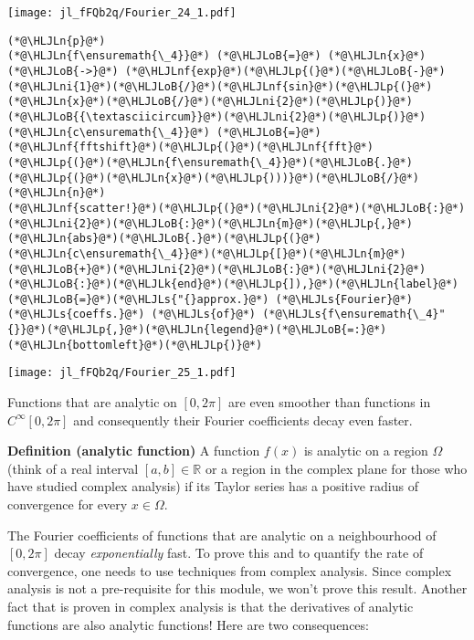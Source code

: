 \documentclass[12pt,a4paper]{article}
\newcommand{\HLJLk}[1]{\textcolor[RGB]{148,91,176}{\textbf{#1}}}
\newcommand{\HLJLn}[1]{#1}
\newcommand{\HLJLnf}[1]{\textcolor[RGB]{66,102,213}{#1}}
\newcommand{\HLJLs}[1]{\textcolor[RGB]{201,61,57}{#1}}
\newcommand{\HLJLni}[1]{\textcolor[RGB]{59,151,46}{#1}}
\newcommand{\HLJLoB}[1]{\textcolor[RGB]{102,102,102}{\textbf{#1}}}
\newcommand{\HLJLp}[1]{#1}
\begin{document}
\texttt{[image: jl\_fFQb2q/Fourier\_24\_1.pdf]}

\begin{lstlisting}
(*@\HLJLn{p}@*)
(*@\HLJLn{f\ensuremath{\_4}}@*) (*@\HLJLoB{=}@*) (*@\HLJLn{x}@*) (*@\HLJLoB{->}@*) (*@\HLJLnf{exp}@*)(*@\HLJLp{(}@*)(*@\HLJLoB{-}@*)(*@\HLJLni{1}@*)(*@\HLJLoB{/}@*)(*@\HLJLnf{sin}@*)(*@\HLJLp{(}@*)(*@\HLJLn{x}@*)(*@\HLJLoB{/}@*)(*@\HLJLni{2}@*)(*@\HLJLp{)}@*)(*@\HLJLoB{{\textasciicircum}}@*)(*@\HLJLni{2}@*)(*@\HLJLp{)}@*)
(*@\HLJLn{c\ensuremath{\_4}}@*) (*@\HLJLoB{=}@*) (*@\HLJLnf{fftshift}@*)(*@\HLJLp{(}@*)(*@\HLJLnf{fft}@*)(*@\HLJLp{(}@*)(*@\HLJLn{f\ensuremath{\_4}}@*)(*@\HLJLoB{.}@*)(*@\HLJLp{(}@*)(*@\HLJLn{x}@*)(*@\HLJLp{)))}@*)(*@\HLJLoB{/}@*)(*@\HLJLn{n}@*)
(*@\HLJLnf{scatter!}@*)(*@\HLJLp{(}@*)(*@\HLJLni{2}@*)(*@\HLJLoB{:}@*)(*@\HLJLni{2}@*)(*@\HLJLoB{:}@*)(*@\HLJLn{m}@*)(*@\HLJLp{,}@*)(*@\HLJLn{abs}@*)(*@\HLJLoB{.}@*)(*@\HLJLp{(}@*)(*@\HLJLn{c\ensuremath{\_4}}@*)(*@\HLJLp{[}@*)(*@\HLJLn{m}@*)(*@\HLJLoB{+}@*)(*@\HLJLni{2}@*)(*@\HLJLoB{:}@*)(*@\HLJLni{2}@*)(*@\HLJLoB{:}@*)(*@\HLJLk{end}@*)(*@\HLJLp{]),}@*)(*@\HLJLn{label}@*)(*@\HLJLoB{=}@*)(*@\HLJLs{"{}approx.}@*) (*@\HLJLs{Fourier}@*) (*@\HLJLs{coeffs.}@*) (*@\HLJLs{of}@*) (*@\HLJLs{f\ensuremath{\_4}"{}}@*)(*@\HLJLp{,}@*)(*@\HLJLn{legend}@*)(*@\HLJLoB{=:}@*)(*@\HLJLn{bottomleft}@*)(*@\HLJLp{)}@*)
\end{lstlisting}

\texttt{[image: jl\_fFQb2q/Fourier\_25\_1.pdf]}

Functions that  are analytic on $[0, 2\pi]$ are even smoother than functions in $C^{\infty}[0, 2\pi]$ and consequently their Fourier coefficients decay even faster.

\textbf{Definition (analytic function)} A function $f(x)$ is analytic on a region $\Omega$ (think of a real interval $[a, b] \in \mathbb{R}$ or a region in the complex plane for those who have studied complex analysis) if its Taylor series has a positive radius of convergence for every $x \in \Omega$.

The Fourier coefficients of functions that are analytic on a neighbourhood of $[0, 2\pi]$ decay \emph{exponentially} fast.  To prove this and to quantify the rate of convergence, one needs to use techniques from complex analysis.  Since complex analysis is not a pre-requisite for this module, we won't prove this result.  Another fact that is proven in complex analysis is that the derivatives of analytic functions are also analytic functions! Here are two consequences:
\end{document}
